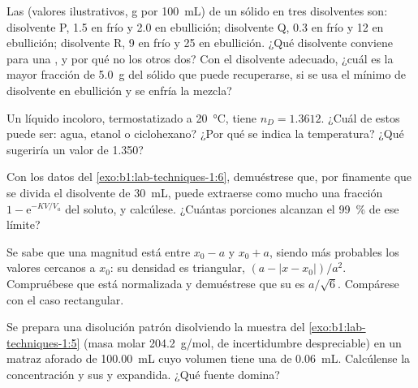 \begin{exercise}[$\star\star$]\label{exo:b1:lab-techniques-1:8}
Las  (valores ilustrativos, \unit{g} por \qty{100}{mL}) de un
sólido en tres disolventes son: disolvente P, 1.5 en frío y 2.0 en
ebullición; disolvente Q, 0.3 en frío y 12 en ebullición; disolvente R, 9
en frío y 25 en ebullición. ¿Qué disolvente conviene para una
, y por qué no los otros dos? Con el disolvente
adecuado, ¿cuál es la mayor fracción de \qty{5.0}{g} del sólido que puede
recuperarse, si se usa el mínimo de disolvente en ebullición y se enfría
la mezcla?
\end{exercise}

\begin{exercise}[$\star\star$]\label{exo:b1:lab-techniques-1:9}
Un líquido incoloro, termostatizado a \qty{20}{\celsius}, tiene
$n_D = 1.3612$. ¿Cuál de estos puede ser: agua, etanol o ciclohexano? ¿Por
qué se indica la temperatura? ¿Qué sugeriría un valor de 1.350?
\end{exercise}

\begin{exercise}[$\star\star\star$]\label{exo:b1:lab-techniques-1:10}
Con los datos del \cref{exo:b1:lab-techniques-1:6}, demuéstrese que, por
finamente que se divida el disolvente de \qty{30}{mL}, puede extraerse
como mucho una fracción $1 - \mathrm{e}^{-KV/V_a}$ del soluto, y
calcúlese. ¿Cuántas porciones alcanzan el \qty{99}{\percent} de ese
límite?
\end{exercise}

\begin{exercise}[$\star\star\star$]\label{exo:b1:lab-techniques-1:11}
Se sabe que una magnitud está entre $x_0 - a$ y $x_0 + a$, siendo más
probables los valores cercanos a $x_0$: su densidad es triangular,
$(a - |x - x_0|)/a^2$. Compruébese que está normalizada y demuéstrese que
su  es $a/\sqrt6$. Compárese con el caso
rectangular.
\end{exercise}

\begin{exercise}[$\star\star\star$]\label{exo:b1:lab-techniques-1:12}
Se prepara una disolución patrón disolviendo la muestra del
\cref{exo:b1:lab-techniques-1:5} (masa molar \qty{204.2}{g/mol}, de
incertidumbre despreciable) en un matraz aforado de \qty{100.00}{mL} cuyo
volumen tiene una  de \qty{0.06}{mL}. Calcúlense la
concentración y sus  y expandida. ¿Qué fuente
domina?
\end{exercise}

